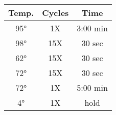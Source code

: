 \documentclass{article}
\begin{document}
\vspace{5mm}
\begin{minipage}[c]{\linewidth}
\centering
\begin{tabular}{ |c|c|c| }
\hline
Temp. & Cycles & Time\\
\hline
95\si{\degree} & 1X & 3:00 min \\
98\si{\degree} & 15X & 30 sec \\
62\si{\degree} & 15X & 30 sec \\
72\si{\degree} & 15X & 30 sec \\
72\si{\degree} & 1X & 5:00 min \\
4\si{\degree} & 1X & hold \\
 \hline
\end{tabular}
\label{table_pcr1}
\end{minipage}
\end{document}
